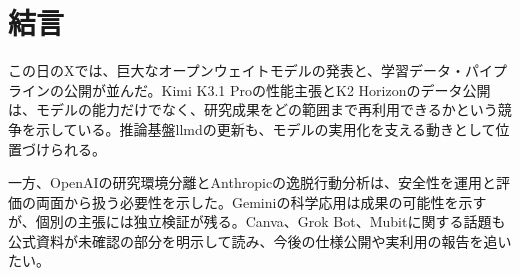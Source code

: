 \section*{結言}
この日のXでは、巨大なオープンウェイトモデルの発表と、学習データ・パイプラインの公開が並んだ。Kimi K3.1 Proの性能主張とK2 Horizonのデータ公開は、モデルの能力だけでなく、研究成果をどの範囲まで再利用できるかという競争を示している。推論基盤llmdの更新も、モデルの実用化を支える動きとして位置づけられる。

一方、OpenAIの研究環境分離とAnthropicの逸脱行動分析は、安全性を運用と評価の両面から扱う必要性を示した。Geminiの科学応用は成果の可能性を示すが、個別の主張には独立検証が残る。Canva、Grok Bot、Mubitに関する話題も公式資料が未確認の部分を明示して読み、今後の仕様公開や実利用の報告を追いたい。
